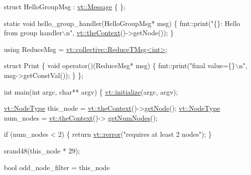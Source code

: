 \begin{DoxyCodeInclude}
\textcolor{keyword}{struct }HelloGroupMsg : \hyperlink{structvt_1_1messaging_1_1_active_msg}{vt::Message} \{ \};

\textcolor{keyword}{static} \textcolor{keywordtype}{void} hello\_group\_handler(HelloGroupMsg* msg) \{
  fmt::print(\textcolor{stringliteral}{"\{\}: Hello from group handler\(\backslash\)n"}, \hyperlink{namespacevt_a26551fe0e6e6a1371111df5b12c7e92c}{vt::theContext}()->getNode());
\}

\textcolor{keyword}{using} ReduceMsg = \hyperlink{structvt_1_1collective_1_1reduce_1_1operators_1_1_reduce_t_msg}{vt::collective::ReduceTMsg<int>};

\textcolor{keyword}{struct }Print \{
  \textcolor{keywordtype}{void} operator()(ReduceMsg* msg) \{
    fmt::print(\textcolor{stringliteral}{"final value=\{\}\(\backslash\)n"}, msg->getConstVal());
  \}
\};

\textcolor{keywordtype}{int} main(\textcolor{keywordtype}{int} argc, \textcolor{keywordtype}{char}** argv) \{
  \hyperlink{namespacevt_aaa266774ea8339c58be0202b00fafa62}{vt::initialize}(argc, argv);

  \hyperlink{namespacevt_a866da9d0efc19c0a1ce79e9e492f47e2}{vt::NodeType} this\_node = \hyperlink{namespacevt_a26551fe0e6e6a1371111df5b12c7e92c}{vt::theContext}()->\hyperlink{structvt_1_1ctx_1_1_context_a0d52c263ce8516546a67443d9a86fa5f}{getNode}();
  \hyperlink{namespacevt_a866da9d0efc19c0a1ce79e9e492f47e2}{vt::NodeType} num\_nodes = \hyperlink{namespacevt_a26551fe0e6e6a1371111df5b12c7e92c}{vt::theContext}()->
      \hyperlink{structvt_1_1ctx_1_1_context_a7f41071aadf6d5fa9e1b6c703c5ff19d}{getNumNodes}();

  \textcolor{keywordflow}{if} (num\_nodes < 2) \{
    \textcolor{keywordflow}{return} \hyperlink{namespacevt_aff96ace008dc847d4c0f44cfa5dfb3a0}{vt::rerror}(\textcolor{stringliteral}{"requires at least 2 nodes"});
  \}

  srand48(this\_node * 29);

  \textcolor{keywordtype}{bool} odd\_node\_filter = this\_node %


\end{DoxyCodeInclude}
